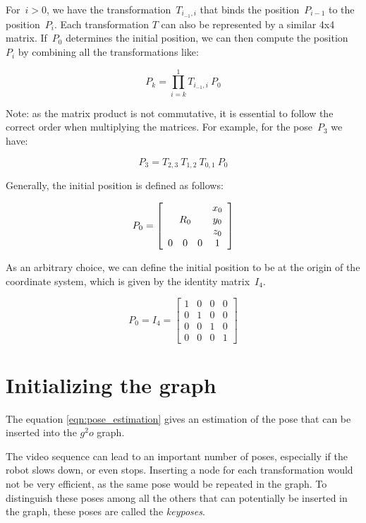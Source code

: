 For~$i>0$, we have the transformation~$T_{i_{-1},i}$ that binds the position~$P_{i-1}$ to the position~$P_i$. Each transformation $T$ can also be represented by a similar 4x4 matrix. If~$P_0$ determines the initial position, we can then compute the position~$P_i$  by combining all the transformations like:

\begin{equation}
P_k = \prod_{i=k}^1{T_{i_{-1},i}} \: P_0
\label{eqn:pose_estimation}
\end{equation}

Note: as the matrix product is not commutative, it is essential to follow the correct order when multiplying the matrices. For example, for the pose~$P_3$ we have:

\[
P_3 = T_{2,3} \: T_{1,2} \: T_{0,1} \: P_0
\]

Generally, the initial position is defined as follows:

\[
P_0 = \left[ \begin{array}{cccc}
 \multicolumn{3}{c}{\multirow{3}{*}{$R_0$}} & x_0 \\
 & & & y_0 \\
 & & & z_0 \\
0 & 0 & 0 & 1 \end{array} \right] 
\]

As an arbitrary choice, we can define the initial position to be at the origin of the coordinate system, which is given by the identity matrix~$I_4$.

\[
P_0 = I_4 = \left[ \begin{array}{cccc}
1 & 0 & 0 & 0 \\
0 & 1 & 0 & 0 \\
0 & 0 & 1 & 0 \\
0 & 0 & 0 & 1 \end{array} \right] 
\]

\section{Initializing the graph}

The equation \ref{eqn:pose_estimation} gives an estimation of the pose that can be inserted into the $g^2o$ graph.

The video sequence can lead to an important number of poses, especially if the robot slows down, or even stops. Inserting a node for each transformation would not be very efficient, as the same pose would be repeated in the graph. To distinguish these poses among all the others that can potentially be inserted in the graph, these poses are called the \emph{keyposes}. 


